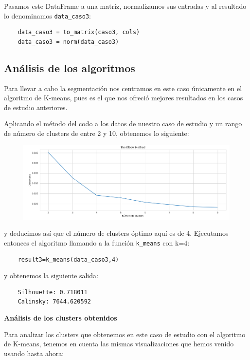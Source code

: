 \documentclass[a4paper,11pt]{book}
\begin{document}
Pasamos este DataFrame a una matriz, normalizamos sus entradas y al resultado lo denominamos \texttt{data_caso3}:
\begin{verbatim}
	data_caso3 = to_matrix(caso3, cols)
	data_caso3 = norm(data_caso3)
\end{verbatim}
\subsection{Análisis de los algoritmos}
Para llevar a cabo la segmentación nos centramos en  este caso únicamente en el algoritmo de K-means, pues es el que nos ofreció mejores resultados en los casos de estudio anteriores. 

Aplicando el método del codo a los datos de nuestro caso de estudio y un rango de número de clusters de entre 2 y 10, obtenemos lo siguiente: 
\begin{figure}[h]
	\centering
	\includegraphics[width=1\linewidth]{img/elbow6}
	\caption{}
	\label{fig:elbow6}
\end{figure}

y deducimos así que el número de clusters óptimo aquí es de 4. Ejecutamos entonces el algoritmo llamando a la función \texttt{k_means} con k=4:
\begin{verbatim}
	result3=k_means(data_caso3,4)
\end{verbatim}

y obtenemos la siguiente salida:
\begin{verbatim}
	Silhouette: 0.718011
	Calinsky: 7644.620592
\end{verbatim}
\textbf{Análisis de los clusters obtenidos}

Para analizar los clusters que obtenemos en este caso de estudio con el algoritmo de K-means, tenemos en cuenta las mismas visualizaciones que hemos venido usando hasta ahora:
\end{document}
